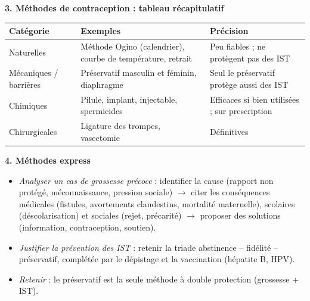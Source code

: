 \documentclass[11pt]{article}
\newcommand{\cle}[1]{{\popxbold\color{popdark}#1}}
\begin{document}
\begin{bilan}
\textbf{3. Méthodes de contraception : tableau récapitulatif}
\begin{center}
\begin{tabularx}{\linewidth}{|l|X|X|}\hline
\rowcolor{popgreenL} \textbf{Catégorie} & \textbf{Exemples} & \textbf{Précision} \\ \hline
Naturelles & Méthode Ogino (calendrier), courbe de température, retrait & Peu fiables ; ne protègent pas des IST \\ \hline
Mécaniques / barrières & Préservatif masculin et féminin, diaphragme & Seul le préservatif protège aussi des IST \\ \hline
Chimiques & Pilule, implant, injectable, spermicides & Efficaces si bien utilisées ; sur prescription \\ \hline
Chirurgicales & Ligature des trompes, vasectomie & Définitives \\ \hline
\end{tabularx}
\end{center}

\textbf{4. Méthodes express}
\begin{itemize}
  \item \emph{Analyser un cas de grossesse précoce} : identifier la cause (rapport non protégé, méconnaissance, pression sociale) $\to$ citer les conséquences médicales (fistules, avortements clandestins, mortalité maternelle), scolaires (déscolarisation) et sociales (rejet, précarité) $\to$ proposer des solutions (information, contraception, soutien).
  \item \emph{Justifier la prévention des IST} : retenir la triade \cle{abstinence -- fidélité -- préservatif}, complétée par le dépistage et la vaccination (hépatite B, HPV).
  \item \emph{Retenir} : le préservatif est la seule méthode à double protection (grossesse + IST).
\end{itemize}
\end{bilan}
\end{document}
